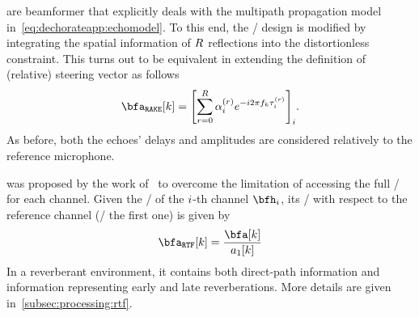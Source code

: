  are beamformer that explicitly deals with the multipath propagation model in~\cref{eq:dechorateapp:echomodel}.
To this end, the \MVDR/ design is modified by integrating the spatial information of $R$ reflections into the distortionless constraint.
This turns out to be equivalent in extending the definition of (relative) steering vector as follows
\begin{equation}
    \bfa_{\mathtt{RAKE}}[k] = \kbracket{ \sum_{\idxEch=0}^{\numEchs} \alpha_{\idxMic}^{(r)} \cste^{-\csti 2 \pi f_k \tau_i^{(r)}} }_i
    .
\end{equation}
As before, both the echoes' delays and amplitudes are considered relatively to the reference microphone.

 was proposed by the work of~ to overcome the limitation of accessing the full \RTFs/ for each channel.
Given the \RTF/ of the $i$-th channel $\bfh_\idxMic$, its \ReTF/ with respect to the reference channel (\eg/ the first one) is given by
\begin{equation}
    \bfa_{\mathtt{RTF}}[k] = \frac{\bfa[k]}{a_1[k]}
\end{equation}
In a reverberant environment, it contains both direct-path information and information representing early and late reverberations.
More details are given in~\cref{subsec:processing:rtf}.



